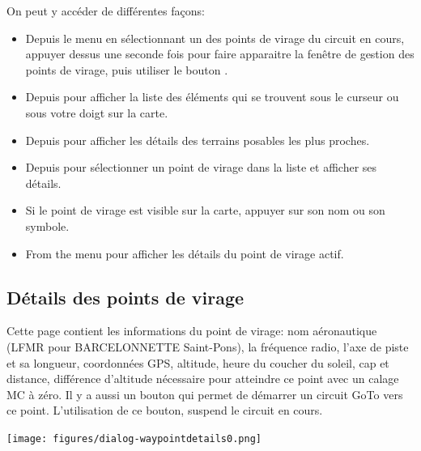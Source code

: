 On peut y accéder de différentes façons:
\begin{itemize}
\item
Depuis le menu \blink{}\blink{} en sélectionnant un des points de virage du circuit en cours, appuyer dessus une seconde fois pour faire apparaitre la fenêtre de gestion des points de virage, puis utiliser le bouton  .

\item
Depuis \blink{} pour afficher la liste des éléments qui se trouvent sous le curseur ou sous votre doigt sur la carte.

\item
Depuis \blink{} pour afficher les détails des terrains posables les plus proches.

\item
Depuis \blink{} pour sélectionner un point de virage dans la liste et afficher ses détails.

\item
Si le point de virage est visible sur la carte, appuyer sur son nom ou son symbole.

\item 
From the menu \blink{} pour afficher les détails du point de virage actif.
\end{itemize}



\subsection*{Détails des points de virage}\label{sec:waypointdetails}
Cette page contient les informations du point de virage: nom aéronautique (LFMR pour BARCELONNETTE Saint-Pons), la fréquence radio, l'axe de piste et sa longueur, coordonnées GPS, altitude, heure du coucher du soleil, cap et distance, différence d'altitude nécessaire pour atteindre ce point avec un calage MC à zéro. Il y a aussi un bouton  qui permet de démarrer un circuit GoTo vers ce point. L'utilisation de ce bouton, suspend le circuit en cours.

\begin{center}
\texttt{[image: figures/dialog-waypointdetails0.png]}
\end{center}

